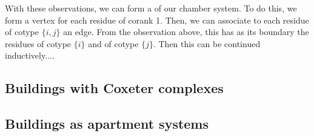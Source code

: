 \documentclass[11pt]{article}
\begin{document}
With these observations, we can form a  of our chamber system. To do this, we form a vertex for each residue of corank 1. Then, we can associate to each residue of cotype $\{i,j\}$ an edge. From the observation above, this has as its boundary the residues of cotype $\{i\}$ and of cotype $\{j\}$. Then this can be continued inductively....











\subsection{Buildings with Coxeter complexes}


\subsection{Buildings as apartment systems}

































































































\end{document}
